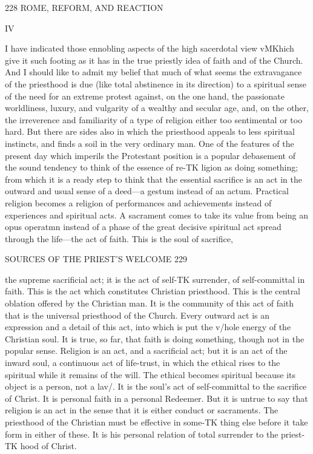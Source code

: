 \documentclass[12pt,a5paper,oneside]{book}
\begin{document}
{{228 ROME, REFORM, AND REACTION 

IV 

I have indicated those ennobling aspects of the high 
sacerdotal view vMKhich give it such footing as it has in 
the true priestly idea of faith and of the Church. 
And I should like to admit my belief that much of 
what seems the extravagance of the priesthood is due 
(like total abstinence in its direction) to a spiritual 
sense of the need for an extreme protest against, on 
the one hand, the passionate worldliness, luxury, and 
vulgarity of a wealthy and secular age, and, on the 
other, the irreverence and familiarity of a type of 
religion either too sentimental or too hard. But there 
are sides also in which the priesthood appeals to less 
spiritual instincts, and finds a soil in the very ordinary 
man. One of the features of the present day which 
imperils the Protestant position is a popular debasement 
of the sound tendency to think of the essence of re-TK
ligion as doing something; from which it is a ready 
step to think that the essential sacrifice is an act in the 
outward and usual sense of a deed---a gestum instead 
of an actum. Practical religion becomes a religion of 
performances and achievements instead of experiences 
and spiritual acts. A sacrament comes to take its 
value from being an opus operatmn instead of a phase 
of the great decisive spiritual act spread through the 
life---the act of faith. This is the soul of sacrifice, 



SOURCES OF THE PRIEST'S WELCOME 229 

the supreme sacrificial act; it is the act of self-TK
surrender, of self-committal in faith. This is the act 
which constitutes Christian priesthood. This is the 
central oblation offered by the Christian man. It is 
the community of this act of faith that is the universal 
priesthood of the Church. Every outward act is an 
expression and a detail of this act, into which is put 
the v/hole energy of the Christian soul. It is true, so 
far, that faith is doing something, though not in the 
popular sense. Religion is an act, and a sacrificial act; 
but it is an act of the inward soul, a continuous act 
of life-trust, in which the ethical rises to the spiritual 
while it remains of the will. The ethical becomes 
spiritual because its object is a person, not a lav/. It 
is the soul's act of self-committal to the sacrifice of 
Christ. It is personal faith in a personal Redeemer. 
But it is untrue to say that religion is an act in the 
sense that it is either conduct or sacraments. The 
priesthood of the Christian must be effective in some-TK
thing else before it take form in either of these. It is 
his personal relation of total surrender to the priest-TK
hood of Christ. 

}}
\end{document}
